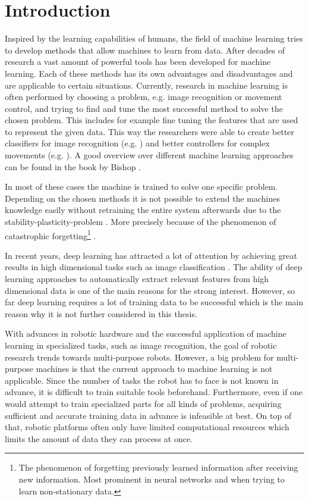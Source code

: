 \chapter{Introduction}


Inspired by the learning capabilities of humans, the field of machine learning tries to develop methods that allow machines to learn from data.
After decades of research a vast amount of powerful tools has been developed for machine learning. Each of these methods has its own advantages and disadvantages and are applicable to certain situations. Currently, research in machine learning is often performed by choosing a problem, e.g. image recognition or movement control, and trying to find and tune the most successful method to solve the chosen problem. This includes for example fine tuning the features that are used to represent the given data. This way the researchers were able to create better classifiers for image recognition (e.g. \cite{Liao20141187}) and better controllers for complex movements (e.g. \cite{NIPS2014_5444}). A good overview over different machine learning approaches can be found in the book by Bishop \cite{bishop2006pattern}.

In most of these cases the machine is trained to solve one specific problem. Depending on the chosen methods it is not possible to extend the machines knowledge easily without retraining the entire system afterwards due to the stability-plasticity-problem \cite{GROSSBERG198817}. More precisely because of the phenomenon of catastrophic forgetting\footnote{The phenomenon of forgetting previously learned information after receiving new information. Most prominent in neural networks and when trying to learn non-stationary data.} \cite{catastrophicForgetting1}.

In recent years, deep learning \cite{deepLearning2009,deepFrontier} has attracted a lot of attention by achieving great results in high dimensional tasks such as image classification \cite{deepImageClassification}. The ability of deep learning approaches to automatically extract relevant features from high dimensional data is one of the main reasons for the strong interest. However, so far deep learning requires a lot of training data to be successful which is the main reason why it is not further considered in this thesis.

With advances in robotic hardware and the successful application of machine learning in specialized tasks, such as image recognition, the goal of robotic research trends towards multi-purpose robots. However, a big problem for multi-purpose machines is that the current approach to machine learning is not applicable. Since the number of tasks the robot has to face is not known in advance, it is difficult to train suitable tools beforehand. Furthermore, even if one would attempt to train specialized parts for all kinds of problems, acquiring sufficient and accurate training data in advance is infeasible at best. On top of that, robotic platforms often only have limited computational resources which limits the amount of data they can process at once.

